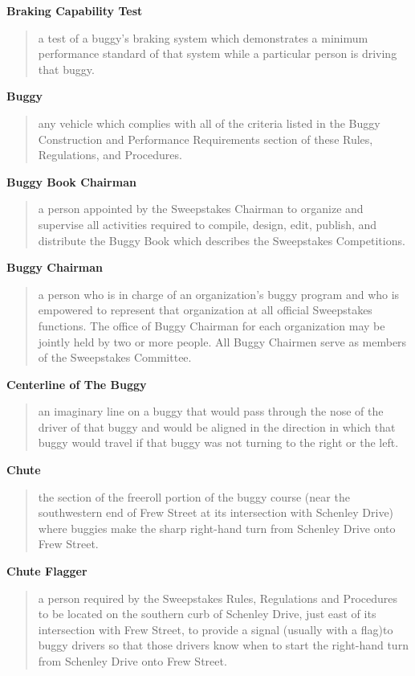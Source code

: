 \documentclass[openany]{book}
\begin{document}
\textbf{Braking Capability Test}
\begin{quote}
	a test of a buggy's braking system which demonstrates a minimum performance standard of that system while a particular person is driving that buggy.
\end{quote}

\textbf{Buggy}
\begin{quote}
	any vehicle which complies with all of the criteria listed in the Buggy Construction and Performance Requirements section of these Rules, Regulations, and Procedures.
\end{quote}

\textbf{Buggy Book Chairman}
\begin{quote}
	a person appointed by the Sweepstakes Chairman to organize and supervise all activities required to compile, design, edit, publish, and distribute the Buggy Book which describes the Sweepstakes Competitions.
\end{quote}

\textbf{Buggy Chairman}
\begin{quote}
	a person who is in charge of an organization's buggy program and who is empowered to represent that organization at all official Sweepstakes functions. The office of Buggy Chairman for each organization may be jointly held by two or more people. All Buggy Chairmen serve as members of the Sweepstakes Committee.
\end{quote}

\textbf{Centerline of The Buggy}
\begin{quote}
	an imaginary line on a buggy that would pass through the nose of the driver of that buggy and would be aligned in the direction in which that buggy would travel if that buggy was not turning to the right or the left.
\end{quote}

\textbf{Chute}
\begin{quote}
	the section of the freeroll portion of the buggy course (near the southwestern end of Frew Street at its intersection with Schenley Drive) where buggies make the sharp right-hand turn from Schenley Drive onto Frew Street.
\end{quote}

\textbf{Chute Flagger}
\begin{quote}
	a person required by the Sweepstakes Rules, Regulations and Procedures to be located on the southern curb of Schenley Drive, just east of its intersection with Frew Street, to provide a signal (usually with a flag)to buggy drivers so that those drivers know when to start the right-hand turn from Schenley Drive onto Frew Street.
\end{quote}
\end{document}
